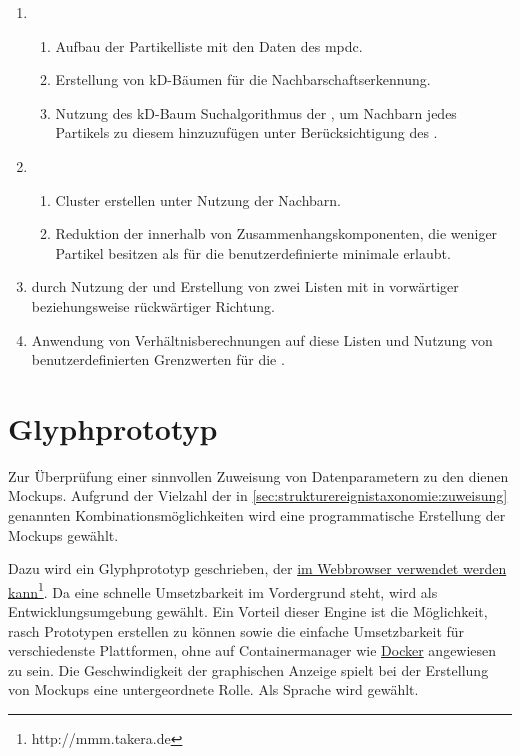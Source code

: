\begin{enumerate}
	\item
	\begin{enumerate}
		\item Aufbau der Partikelliste mit den Daten des \gls{mpdc}.
		\item Erstellung von kD-Bäumen für die Nachbarschaftserkennung.
		\item Nutzung des kD-Baum Suchalgorithmus der \ANN, um Nachbarn jedes Partikels zu diesem hinzuzufügen unter Berücksichtigung des .
	\end{enumerate}
	\item
	\begin{enumerate}
		\item Cluster erstellen unter Nutzung der Nachbarn.
		\item Reduktion der  innerhalb von Zusammenhangskomponenten, die weniger Partikel besitzen als für die benutzerdefinierte minimale  erlaubt.
	\end{enumerate}
	\item \SECC durch Nutzung der  und Erstellung von zwei Listen mit  in vorwärtiger beziehungsweise rückwärtiger Richtung.
	\item Anwendung von Verhältnisberechnungen auf diese Listen und Nutzung von benutzerdefinierten Grenzwerten für die .
\end{enumerate}

\section{Glyphprototyp}\label{sec:glyphprototyp}
Zur Überprüfung einer sinnvollen Zuweisung von Datenparametern zu den  dienen Mockups. Aufgrund der Vielzahl der in \autoref{sec:strukturereignistaxonomie:zuweisung} genannten Kombinationsmöglichkeiten wird eine programmatische Erstellung der Mockups gewählt.

Dazu wird ein Glyphprototyp geschrieben, der \href{http://mmm.takera.de}{im Webbrowser verwendet werden kann}\footnote{http://mmm.takera.de}. Da eine schnelle Umsetzbarkeit im Vordergrund steht, wird  als Entwicklungsumgebung gewählt. Ein Vorteil dieser Engine ist die Möglichkeit, rasch Prototypen erstellen zu können sowie die einfache Umsetzbarkeit für verschiedenste Plattformen, ohne auf Containermanager wie \href{https://www.docker.com/}{Docker} angewiesen zu sein.
Die Geschwindigkeit der graphischen Anzeige spielt bei der Erstellung von Mockups eine untergeordnete Rolle. Als Sprache wird  gewählt.

